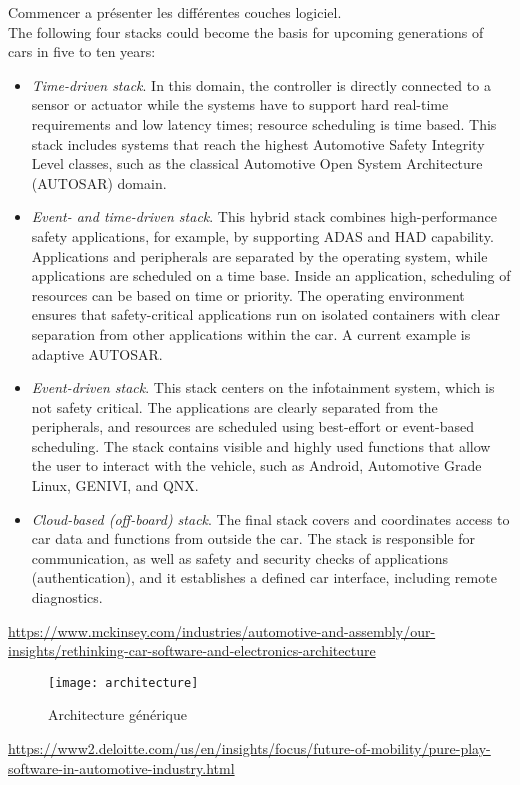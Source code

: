 \begin{tbd}
Commencer a pr\'esenter les diff\'erentes couches logiciel.\\

The following four stacks could become the basis for upcoming generations of cars in five to ten years:
\begin{itemize}

\item \emph{Time-driven stack}. In this domain, the controller is directly connected to a sensor or actuator while the systems have to support hard real-time requirements and low latency times; resource scheduling is time based. This stack includes systems that reach the highest Automotive Safety Integrity Level classes, such as the classical Automotive Open System Architecture (AUTOSAR) domain.
\item \emph{Event- and time-driven stack}. This hybrid stack combines high-performance safety applications, for example, by supporting ADAS and HAD capability. Applications and peripherals are separated by the operating system, while applications are scheduled on a time base. Inside an application, scheduling of resources can be based on time or priority. The operating environment ensures that safety-critical applications run on isolated containers with clear separation from other applications within the car. A current example is adaptive AUTOSAR.
\item \emph{Event-driven stack}. This stack centers on the infotainment system, which is not safety critical. The applications are clearly separated from the peripherals, and resources are scheduled using best-effort or event-based scheduling. The stack contains visible and highly used functions that allow the user to interact with the vehicle, such as Android, Automotive Grade Linux, GENIVI, and QNX.
\item \emph{Cloud-based (off-board) stack}. The final stack covers and coordinates access to car data and functions from outside the car. The stack is responsible for communication, as well as safety and security checks of applications (authentication), and it establishes a defined car interface, including remote diagnostics.
\end{itemize}

\url{https://www.mckinsey.com/industries/automotive-and-assembly/our-insights/rethinking-car-software-and-electronics-architecture}
\end{tbd}


\FloatBarrier
\begin{figure}
    \texttt{[image: architecture]}
    \caption{Architecture g\'en\'erique}
    \label{fig:archi}
\end{figure}
\url{https://www2.deloitte.com/us/en/insights/focus/future-of-mobility/pure-play-software-in-automotive-industry.html}
\FloatBarrier

